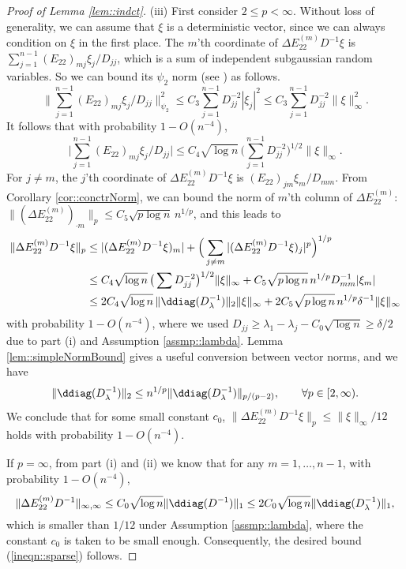 \documentclass[12pt]{article}%
\theoremstyle{plain}%
\theoremstyle{remark}
\begin{document}
\begin{proof}[Proof of Lemma \ref{lem::indct}]
(iii) First consider $2 \le p < \infty$. Without loss of generality, we can assume that $\xi$ is a deterministic vector, since we can always condition on $\xi$ in the first place.  The $m$'th coordinate of $\Delta E_{22}^{(m)} D^{-1} \xi$ is $\sum_{j=1}^{n-1}(E_{22})_{mj} \xi_j / D_{jj}$, which is a sum of independent subgaussian random variables. So we can bound its $\psi_2$ norm (see \cite{Ver10}) as follows.
\begin{equation*}
\big\| \sum_{j=1}^{n-1}(E_{22})_{mj} \xi_j / D_{jj} \big\|_{\psi_2}^2 \le C_3 \sum_{j=1}^{n-1}  D_{jj}^{-2} | \xi_j|^2 \le C_3 \sum_{j=1}^{n-1}  D_{jj}^{-2} \| \xi \|_{\infty}^2.
\end{equation*}
It follows that with probability $1-O(n^{-4})$, 
\begin{equation*}
\big| \sum_{j=1}^{n-1}(E_{22})_{mj} \xi_j / D_{jj} \big| \le C_4 \sqrt{\log n}\, \big( \sum_{j=1}^{n-1} D_{jj}^{-2} \big)^{1/2} \| \xi \|_{\infty}.
\end{equation*}
For $j \neq m$, the $j$'th coordinate of $\Delta E_{22}^{(m)} D^{-1} \xi$ is $(E_{22})_{jm} \xi_m / D_{mm}$. From Corollary \ref{cor::conctrNorm}, we can bound the norm of $m$'th column of $\Delta E_{22}^{(m)}$: $\| (\Delta E_{22}^{(m)})_{\cdot m} \|_p \le C_5 \sqrt{p \log n}\, n^{1/p}$, and this leads to
\begin{align*}
\| \Delta E_{22}^{(m)} D^{-1} \xi \|_p &\le | (\Delta E_{22}^{(m)} D^{-1} \xi)_m | + \Big( \sum_{j \ne m} |(\Delta E_{22}^{(m)} D^{-1} \xi)_j|^p \Big)^{1/p} \\
&\le C_4 \sqrt{\log n}\, \big( \sum D_{jj}^{-2} \big)^{1/2} \| \xi \|_{\infty} + C_5\sqrt{p \log n}\, n^{1/p} D_{mm}^{-1} | \xi_m| \\
&\le 2C_4  \sqrt{\log n}\, \| \ddiag(D_\lambda^{-1}) \|_2 \| \xi \|_{\infty} + 2C_5 \sqrt{p \log n}\, n^{1/p} \delta^{-1} \| \xi \|_{\infty} 
\end{align*}
with probability $1-O(n^{-4})$, where we used $D_{jj} \ge \lambda_1 - \lambda_j - C_0\sqrt{\log n} \ge \delta/2$ due to part (i) and Assumption \ref{assmp::lambda}. Lemma \ref{lem::simpleNormBound} gives a useful conversion between vector norms, and we have 
\begin{equation}\label{DlambdaConv}
\| \ddiag(D_\lambda^{-1}) \|_2 \le n^{1/p} \| \ddiag(D_\lambda^{-1}) \|_{p/(p-2)}, \qquad \forall p \in [2,\infty).
\end{equation}
We conclude that for some small constant $c_0$, $\| \Delta E_{22}^{(m)} D^{-1} \xi \|_p \le \| \xi \|_{\infty}/12$ holds with probability $1-O(n^{-4})$. 

If $p = \infty$, from part (i) and (ii) we know that for any $m = 1,\ldots, n-1$, with probability $1 - O(n^{-4})$,
\begin{equation*}
\| \Delta E_{22}^{(m)} D^{-1} \|_{\infty, \infty} \le C_0 \sqrt{\log n} \| \ddiag(D^{-1}) \|_1 \le 2C_0 \sqrt{\log n} \| \ddiag(D_\lambda^{-1}) \|_1,
\end{equation*}
which is smaller than $1/12$ under Assumption \ref{assmp::lambda}, where the constant $c_0$ is taken to be small enough. Consequently, the desired bound (\ref{ineqn::sparse}) follows. 
\end{proof}
\end{document}
